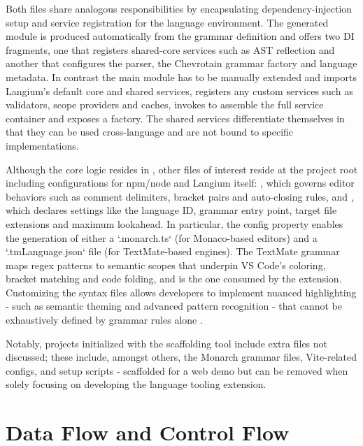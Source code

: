Both  files share analogous responsibilities by encapsulating dependency-injection setup and service registration for the language environment.
The generated module is produced automatically from the grammar definition and offers two DI fragments, one that registers shared-core services such as AST
reflection and another that configures the parser, the Chevrotain grammar factory and language metadata. In contrast the main module has to be manually extended and imports
Langium's default core and shared services, registers any custom services such as validators, scope providers and caches, invokes  to assemble the full
service container and exposes a  factory. The shared services differentiate themselves in that they can be used cross-language and are not bound to
specific implementations.

Although the core logic resides in , other files of interest reside at the project root including configurations for npm/node and Langium itself:
, which governs editor behaviors such as comment delimiters, bracket pairs and auto-closing rules, and
, which declares settings like the language ID, grammar entry point, target file extensions and maximum lookahead.
In particular, the  config property enables the generation of either a `.monarch.ts` (for Monaco-based editors) and a `.tmLanguage.json` file (for TextMate-based engines).
The TextMate grammar maps regex patterns to semantic scopes that underpin VS Code's coloring, bracket
matching and code folding, and is the one consumed by the extension. Customizing the syntax files allows developers to implement nuanced highlighting
- such as semantic theming and advanced pattern recognition - that cannot be exhaustively defined by grammar rules alone \cite{EDKarlsson2022Discussion604}.

Notably, projects initialized with the scaffolding tool include extra files not discussed; these include, amongst others, the Monarch grammar files, Vite-related configs,
and setup scripts - scaffolded for a web demo but can be removed when solely focusing on developing the language tooling extension.

\section{Data Flow and Control Flow}

